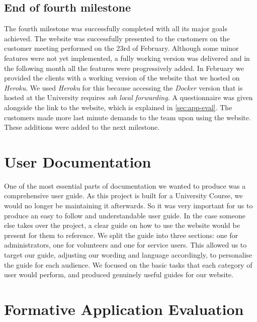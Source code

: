 \documentclass{l3proj}
\begin{document}
\subsection{End of fourth milestone}
\label{sec:milestone4}

The fourth milestone was successfully completed with all its major goals achieved. The website was successfully presented to the customers on the customer meeting performed on the 23rd of February. Although some minor features were not yet implemented, a fully working version was delivered and in the following month all the features were progressively added. In February we provided the clients with a working version of the website that we hosted on \textit{Heroku}. We used \textit{Heroku} for this because accessing the \textit{Docker} version that is hosted at the University requires \textit{ssh local forwarding.} A questionnaire was given alongside the link to the website, which is explained in \autoref{sec:app-eval}. The customers made more last minute demands to the team upon using the website. These additions were added to the next milestone.

\section{User Documentation}
\label{sec:user_doc}

One of the most essential parts of documentation we wanted to produce was a comprehensive user guide. As this project is built for a University Course, we would no longer be maintaining it afterwards. So it was very important for us to produce an easy to follow and understandable user guide. In the case someone else takes over the project, a clear guide on how to use the website would be present for them to reference. We split the guide into three sections: one for administrators, one for volunteers and one for service users. This allowed us to target our guide, adjusting our wording and language accordingly, to personalise the guide for each audience. We focused on the basic tasks that each category of user would perform, and produced genuinely useful guides for our website.

\section{Formative Application Evaluation}
\label{sec:app-eval}
\end{document}
